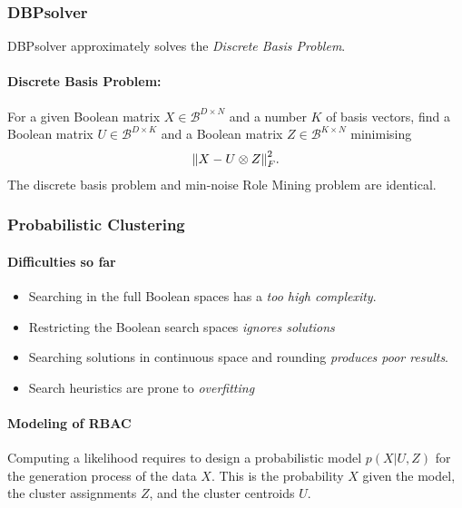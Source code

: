 \subsubsection{DBPsolver}
DBPsolver approximately solves the \emph{Discrete Basis Problem}.
\paragraph{Discrete Basis Problem:} For a given Boolean matrix $X\in \mathcal B^{D\times N}$ and a number $K$ of basis vectors, find a Boolean matrix $U\in \mathcal B^{D\times K}$ and a Boolean matrix $Z\in \mathcal B^{K\times N}$ minimising 
\begin{align*}
    \norm{X-U\otimes Z}_F^2.
\end{align*}
The discrete basis problem and min-noise Role Mining problem are identical.

\subsubsection{Probabilistic Clustering}
\paragraph{Difficulties so far}
\begin{itemize}
 \item Searching in the full Boolean spaces has a \emph{too high complexity}.
 \item Restricting the Boolean search spaces \emph{ignores solutions}
 \item Searching solutions in continuous space and rounding \emph{produces poor results}.
 \item Search heuristics are prone to \emph{overfitting}
\end{itemize}

\paragraph{Modeling of RBAC} Computing a likelihood requires to design a probabilistic model $p(X|U,Z)$ for the generation process of the data $X$. This is the probability $X$ given the model, the cluster assignments $Z$, and the cluster centroids $U$.

